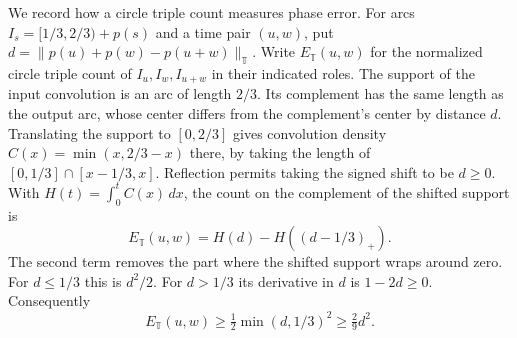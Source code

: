 \documentclass[11pt,reqno]{amsart}
\newcommand{\T}{\mathbb T}
\numberwithin{equation}{section}
\begin{document}
We record how a circle triple count measures phase error. For
arcs \(I_s=[1/3,2/3)+p(s)\) and a time pair \((u,w)\), put
\(d=\|p(u)+p(w)-p(u+w)\|_{\T}\).
Write \(E_{\T}(u,w)\) for the normalized circle triple count of
\(I_u,I_w,I_{u+w}\) in their indicated roles. The support of the
input convolution is an arc of length \(2/3\). Its complement has
the same length as the output arc, whose center differs from the
complement's center by distance \(d\). Translating the support to
\([0,2/3]\) gives convolution density
\(C(x)=\min(x,2/3-x)\) there, by taking the length of
\([0,1/3]\cap[x-1/3,x]\). Reflection permits taking the signed
shift to be \(d\ge0\). With \(H(t)=\int_0^t C(x)\,dx\),
the count on the complement of the shifted support is
\[
 E_{\T}(u,w)=H(d)-H((d-1/3)_+).
\]
The second term removes the part where the shifted support wraps
around zero. For \(d\le1/3\) this is \(d^2/2\).
For \(d>1/3\) its derivative in \(d\) is \(1-2d\ge0\).
Consequently
\begin{equation}\label{eq:circle-count}
 E_{\T}(u,w)\ge \tfrac12\min(d,1/3)^2\ge \tfrac29 d^2 .
\end{equation}
\end{document}
